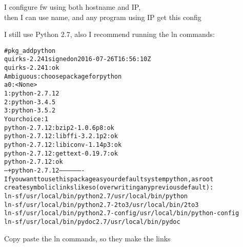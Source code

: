 \documentclass[18pt,landscape,a4paper,footrule]{foils}
\begin{document}
I configure fw using both hostname and IP,\\
then I can use name, and any program using IP get this config



I still use Python 2.7, also I recommend running the ln commands:
\begin{alltt}\scriptsize
# pkg_add python
quirks-2.241 signed on 2016-07-26T16:56:10Z
quirks-2.241: ok
Ambiguous: choose package for python
a       0: <None>
        1: python-2.7.12
        2: python-3.4.5
        3: python-3.5.2
Your choice: 1
python-2.7.12:bzip2-1.0.6p8: ok
python-2.7.12:libffi-3.2.1p2: ok
python-2.7.12:libiconv-1.14p3: ok
python-2.7.12:gettext-0.19.7: ok
python-2.7.12: ok
--- +python-2.7.12 -------------------
If you want to use this package as your default system python, as root
create symbolic links like so (overwriting any previous default):
 ln -sf /usr/local/bin/python2.7 /usr/local/bin/python
 ln -sf /usr/local/bin/python2.7-2to3 /usr/local/bin/2to3
 ln -sf /usr/local/bin/python2.7-config /usr/local/bin/python-config
 ln -sf /usr/local/bin/pydoc2.7  /usr/local/bin/pydoc
\end{alltt}

Copy paste the ln commands, so they make the links
\end{document}
